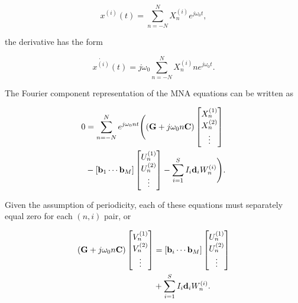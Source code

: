 \documentclass[12pt,journal,compsoc]{../ieeepaper/IEEEtran}
\begin{document}
\begin{equation}\label{eqn:ece1254projectReport:500}
x^{(i)}(t) = \sum_{n=-N}^N X_n^{(i)} e^{j \omega_0 t},
\end{equation}

the derivative has the form

\begin{equation}\label{eqn:ece1254projectReport:520}
\dot{x^{(i)}}(t) = j \omega_0 \sum_{n=-N}^N X_n^{(i)} n e^{j \omega_0 t}.
\end{equation}

The Fourier component representation of the MNA equations can be written as

\begin{equation}\label{eqn:ece1254projectReport:600}
\begin{aligned}
0 &= \sum_{n = -N}^N e^{j \omega_0 n t}
\Biglr{
   \lr{ \BG + j \omega_0 n \BC } 
\begin{bmatrix}
X_n^{(1)} \\
X_n^{(2)} \\
\vdots \\
\end{bmatrix} \\
&- 
[ \Bb_1 \cdots \Bb_M ]
\begin{bmatrix}
U_n^{(1)} \\
U_n^{(2)} \\
\vdots \\
\end{bmatrix}
- \sum_{i = 1}^S I_i \Bd_i
W_n^{(i)} 
}.
\end{aligned}
\end{equation}

Given the 
assumption of periodicity, each of these equations must separately equal zero for each \( ( n, i ) \) pair, or

\begin{equation}\label{eqn:ece1254projectReport:540}
\begin{aligned}
\lr{
\BG + j \omega_0 n \BC
}
\begin{bmatrix}
V_n^{(1)} \\
V_n^{(2)} \\
\vdots \\
\end{bmatrix}
&= 
[\Bb_i \cdots \Bb_M]
\begin{bmatrix}
U_n^{(1)} \\
U_n^{(2)} \\
\vdots \\
\end{bmatrix} \\
&+ \sum_{i = 1}^S I_i \Bd_i
W_n^{(i)} 
.
\end{aligned}
\end{equation}
\end{document}
